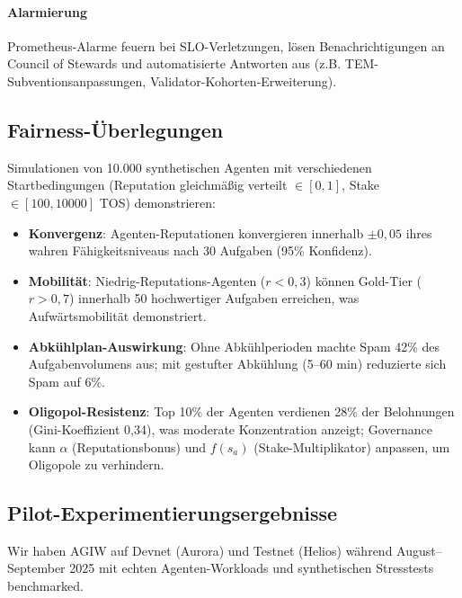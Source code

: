 \documentclass[11pt]{article}
\begin{document}
\paragraph{Alarmierung} Prometheus-Alarme feuern bei SLO-Verletzungen, lösen Benachrichtigungen an Council of Stewards und automatisierte Antworten aus (z.B. TEM-Subventionsanpassungen, Validator-Kohorten-Erweiterung).

\subsection{Fairness-Überlegungen}
Simulationen von 10.000 synthetischen Agenten mit verschiedenen Startbedingungen (Reputation gleichmäßig verteilt $\in [0,1]$, Stake $\in [100, 10000]$ TOS) demonstrieren:
\begin{itemize}[noitemsep]
  \item \textbf{Konvergenz}: Agenten-Reputationen konvergieren innerhalb $\pm0,05$ ihres wahren Fähigkeitsniveaus nach 30 Aufgaben (95\% Konfidenz).
  \item \textbf{Mobilität}: Niedrig-Reputations-Agenten ($r<0,3$) können Gold-Tier ($r>0,7$) innerhalb 50 hochwertiger Aufgaben erreichen, was Aufwärtsmobilität demonstriert.
  \item \textbf{Abkühlplan-Auswirkung}: Ohne Abkühlperioden machte Spam 42\% des Aufgabenvolumens aus; mit gestufter Abkühlung (5--60 min) reduzierte sich Spam auf 6\%.
  \item \textbf{Oligopol-Resistenz}: Top 10\% der Agenten verdienen 28\% der Belohnungen (Gini-Koeffizient 0,34), was moderate Konzentration anzeigt; Governance kann $\alpha$ (Reputationsbonus) und $f(s_a)$ (Stake-Multiplikator) anpassen, um Oligopole zu verhindern.
\end{itemize}

\subsection{Pilot-Experimentierungsergebnisse}
\label{sec:pilot-results}
Wir haben AGIW auf Devnet (Aurora) und Testnet (Helios) während August--September 2025 mit echten Agenten-Workloads und synthetischen Stresstests benchmarked.
\end{document}
